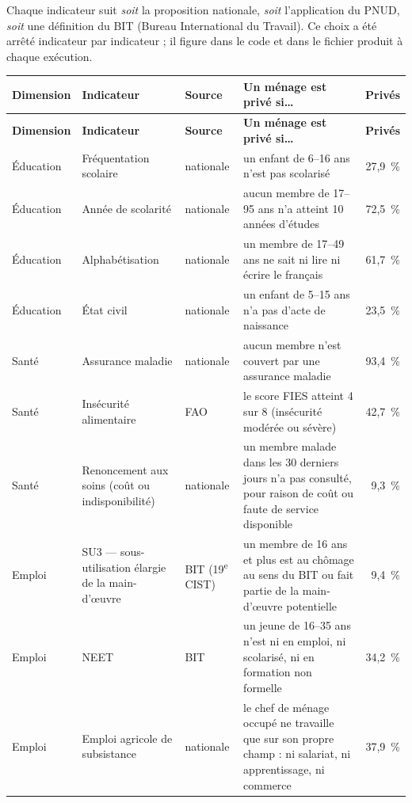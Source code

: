 \documentclass[11pt,a4paper]{article}
\begin{document}
Chaque indicateur suit \emph{soit} la proposition nationale, \emph{soit} l'application du PNUD,
\emph{soit} une définition du BIT (Bureau International du Travail). Ce choix a été arrêté
indicateur par indicateur ; il figure dans le code et dans le fichier  produit
à chaque exécution.

\begin{center}
\small
\begin{longtable}{@{}>{\RaggedRight}p{2.1cm}>{\RaggedRight}p{2.5cm}l>{\RaggedRight}p{5.4cm}r@{}}
\toprule
\textbf{Dimension} & \textbf{Indicateur} & \textbf{Source} & \textbf{Un ménage est privé si\ldots} &
\textbf{Privés} \\
\midrule
\endfirsthead
\toprule
\textbf{Dimension} & \textbf{Indicateur} & \textbf{Source} & \textbf{Un ménage est privé si\ldots} &
\textbf{Privés} \\
\midrule
\endhead
Éducation & Fréquentation scolaire & nationale & un enfant de 6--16 ans n'est pas scolarisé
& 27,9~\% \\
Éducation & Année de scolarité & nationale & aucun membre de 17--95 ans n'a atteint 10 années
d'études & 72,5~\% \\
Éducation & Alphabétisation & nationale & un membre de 17--49 ans ne sait ni lire ni écrire le
français & 61,7~\% \\
Éducation & État civil & nationale & un enfant de 5--15 ans n'a pas d'acte de naissance
& 23,5~\% \\
\midrule
Santé & Assurance maladie & nationale & aucun membre n'est couvert par une assurance maladie
& 93,4~\% \\
Santé & Insécurité alimentaire & FAO & le score FIES atteint 4 sur 8 (insécurité modérée ou
sévère) & 42,7~\% \\
Santé & Renoncement aux soins (coût ou indisponibilité) & nationale & un membre malade dans les
30 derniers jours n'a pas consulté, pour raison de coût ou faute de service disponible
& 9,3~\% \\
\midrule
Emploi & SU3 --- sous-utilisation élargie de la main-d'œuvre & BIT (19\textsuperscript{e} CIST) &
un membre de 16 ans et plus est au chômage au sens du BIT ou fait partie de la main-d'œuvre
potentielle & 9,4~\% \\
Emploi & NEET & BIT & un jeune de 16--35 ans n'est ni en emploi, ni scolarisé, ni en formation
non formelle & 34,2~\% \\
Emploi & Emploi agricole de subsistance & nationale & le chef de ménage occupé ne travaille que
sur son propre champ : ni salariat, ni apprentissage, ni commerce & 37,9~\% \\

\end{longtable}
\end{center}
\end{document}
